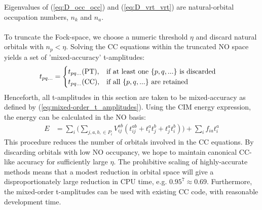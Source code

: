 Eigenvalues of (\ref{eq:D_occ_occ}) and (\ref{eq:D_vrt_vrt}) are natural-orbital occupation numbers, $n_k$ and $n_a$. \\\\ 
To truncate the Fock-space, we choose a numeric threshold $\eta$ and discard natural orbitals with $n_p < \eta$. Solving the CC equations within the truncated NO space yields a set of 'mixed-accuracy' t-amplitudes:
\begin{align}
t_{pq...} &= \begin{cases}
	t_{pq...} \text{(PT)}, & \text{if at least one } \{p, q,...\} \text{ is discarded}  \\
	t_{pq...} \text{(CC)}, & \text{if all } \{p, q,...\} \text{ are retained}
\end{cases}\label{eq:mixed-order_t_amplitudes}
\end{align} 
Henceforth, all t-amplitudes in this section are taken to be mixed-accuracy as defined by (\ref{eq:mixed-order_t_amplitudes}). Using the CIM energy expression, the energy can be calculated in the NO basis: 
\begin{align}
E& = \sum_i \bigg( \sum_{j,a,b, \in P_i} V^{ab}_{ij} (t^{ab}_{ij} + t^a_i t^b_j + t^a_j t^b_i)\bigg)+ \sum_i f_{ia} t^a_i \label{eq:GS_energy}
\end{align}
This procedure reduces the number of orbitals involved in the CC equations. By discarding orbitals with low NO occupancy, we hope to maintain canonical CC-like accuracy for sufficiently large $\eta$. The prohibitive scaling of highly-accurate methods means that a modest reduction in orbital space will give a disproportionately large reduction in CPU time, e.g. $0.95^7 \approx 0.69$. Furthermore, the mixed-order t-amplitudes can be used with existing CC code, with reasonable development time.   \\\\